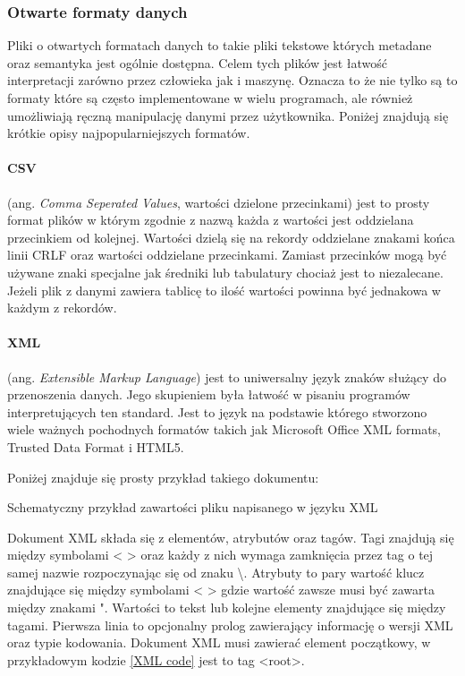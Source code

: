 \subsubsection{Otwarte formaty danych}

Pliki o otwartych formatach danych to takie pliki tekstowe których metadane oraz semantyka jest ogólnie dostępna. 
Celem tych plików jest łatwość interpretacji zarówno przez człowieka jak i maszynę. 
Oznacza to że nie tylko są to formaty które są często implementowane w wielu programach, ale również umożliwiają ręczną manipulację danymi przez użytkownika.  
Poniżej znajdują się krótkie opisy najpopularniejszych formatów.

\paragraph{CSV}
(ang. \textit{Comma Seperated Values}, wartości dzielone przecinkami) jest to prosty format plików w którym zgodnie z nazwą każda z wartości jest oddzielana przecinkiem od kolejnej. Wartości dzielą się na rekordy oddzielane znakami końca linii CRLF oraz wartości oddzielane przecinkami. Zamiast przecinków mogą być używane znaki specjalne jak średniki lub tabulatury chociaż jest to niezalecane. Jeżeli plik z danymi zawiera tablicę to ilość wartości powinna być jednakowa w każdym z rekordów. 

\paragraph{XML}
(ang. \textit{Extensible Markup Language}) jest to uniwersalny język znaków służący do przenoszenia danych. Jego skupieniem była łatwość w pisaniu programów interpretujących ten standard.
Jest to język na podstawie którego stworzono wiele ważnych pochodnych formatów takich jak Microsoft Office XML formats, Trusted Data Format i HTML5.

Poniżej znajduje się prosty przykład takiego dokumentu:
\begin{kod}
        
        \caption{Schematyczny przykład zawartości pliku napisanego w języku XML}
        \label{XML code}
\end{kod}

Dokument XML składa się z elementów, atrybutów oraz tagów. 
Tagi znajdują się między symbolami < > oraz każdy z nich wymaga zamknięcia przez tag o tej samej nazwie rozpoczynając się od znaku \textbackslash.
Atrybuty to pary wartość klucz znajdujące się między symbolami < > gdzie wartość zawsze musi być zawarta między znakami ".
Wartości to tekst lub kolejne elementy znajdujące się między tagami. 
Pierwsza linia to opcjonalny prolog zawierający informację o wersji XML oraz typie kodowania.  
Dokument XML musi zawierać element początkowy, w przykładowym kodzie \ref{XML code} jest to tag <root>.


